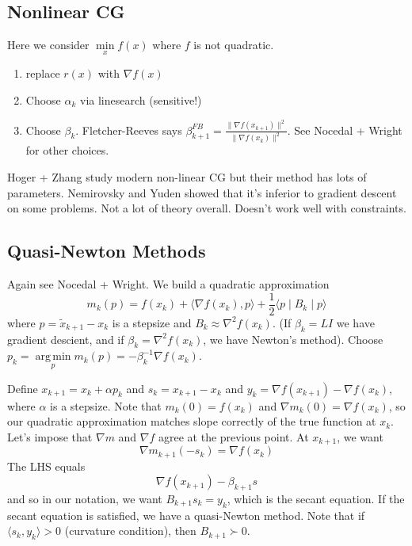 \documentclass[english, 11pt]{article}
\DeclareMathOperator*{\argmin}{arg\,min}
\begin{document}
\subsection{Nonlinear CG}
Here we consider $\min \limits_x f(x)$ where $f$ is not quadratic.
\begin{enumerate}
\item replace $r(x)$ with $\nabla f(x)$
\item Choose $\alpha_k$ via linesearch (sensitive!)
\item Choose $\beta_k$. Fletcher-Reeves says $\beta_{k+1}^{FB} =\frac{ \| \nabla f(x_{k+1}) \|^2}{ \| \nabla f(x_k) \|^2}$. See Nocedal + Wright for other choices.
\end{enumerate}

\begin{rem}
Hoger + Zhang study modern non-linear CG but their method has lots of parameters. Nemirovsky and Yuden showed that it's inferior to gradient descent on some problems. Not a lot of theory overall. Doesn't work well with constraints.
\end{rem}


\subsection{Quasi-Newton Methods}
Again see Nocedal + Wright. We build a quadratic approximation 
\[
m_k(p) = f(x_k) + \langle \nabla f(x_k) , p \rangle + \frac{1}{2} \langle p \mid B_k \mid p \rangle
\]
 where $p = \tilde x_{k+1} - x_k$ is a stepsize and $B_k \approx \nabla^2 f(x_k)$. (If $\beta_k = LI$ we have gradient descient, and if $\beta_k = \nabla^2 f(x_k)$, we have Newton's method).
Choose $p_k = \argmin \limits_p m_k(p) = - \beta_k^{-1} \nabla f(x_k)$. 



Define $x_{k+1} = x_k + \alpha p_k$ and $s_k = x_{k+1} - x_k$ and $y_k = \nabla f(x_{k+1}) - \nabla f(x_k)$, where $\alpha$ is a stepsize. Note that $m_k(0) = f(x_k)$ and $\nabla m_k(0) = \nabla f(x_k)$, so our quadratic approximation matches slope correctly of the true function at $x_k$. Let's impose that $\nabla m$ and $\nabla f$ agree at the previous point. At $x_{k+1}$, we want
\[
\nabla m_{k+1} (- s_k)  = \nabla f(x_k)
\]
The LHS equals
\[
\nabla f(x_{k+1}) - \beta_{k+1} s
\]
and so in our notation, we want $B_{k+1} s_k = y_k$, which is the secant equation. If the secant equation is satisfied, we have a quasi-Newton method. Note that if $\langle s_k, y_k \rangle>0$ (curvature condition), then $B_{k+1} \succ 0$.
\end{document}
